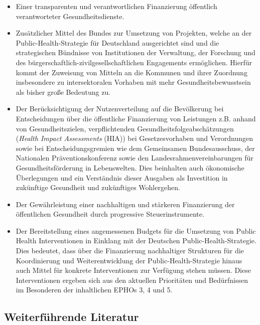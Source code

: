 \documentclass{article}
\begin{document}
\begin{itemize}
\item Einer transparenten und verantwortlichen Finanzierung öffentlich verantworteter Gesundheitsdienste. 


\item Zusätzlicher Mittel des Bundes zur Umsetzung von Projekten, welche an der Public-Health-Strategie für Deutschland ausgerichtet sind und die strategischen Bündnisse von Institutionen der Verwaltung, der Forschung und des bürgerschaftlich-zivilgesellschaftlichen Engagements ermöglichen. Hierfür kommt der Zuweisung von Mitteln an die Kommunen und ihrer Zuord­nung insbesondere zu intersektoralen Vorhaben mit mehr Gesundheitsbewusstsein als bisher große Bedeutung zu.


\item Der Berücksichtigung der Nutzenverteilung auf die Bevölkerung bei Entscheidungen über die öffentliche Finanzierung von Leistungen z.B. anhand von Gesundheitszielen, verpflichtenden Gesundheitsfolgeabschätzungen (\emph{Health Impact Assessments} (HIA)) bei Gesetzesvorhaben und Verordnungen sowie bei Entscheidungsgremien wie dem Gemeinsamen Bundesausschuss, der Nationalen Präventionskonferenz sowie den Landesrahmenvereinbarungen für Gesundheitsförderung in Lebenswelten. Dies beinhalten auch ökonomische Überlegungen und ein Verständnis dieser Ausgaben als Investition in zukünftige Gesundheit und zukünftiges Wohlergehen.


\item Der Gewährleistung einer nachhaltigen und stärkeren Finanzierung der öffentlichen Gesundheit durch progressive Steuerinstrumente. 


\item Der Bereitstellung eines angemessenen Budgets für die Umsetzung von Public Health Interventionen in Einklang mit der Deutschen Public-Health-Strategie. Dies bedeutet, dass über die Finanzierung nachhaltiger Strukturen für die Koordinierung und Weiterentwicklung der Public-Health-Strategie hinaus auch Mittel für konkrete Interventionen zur Verfügung stehen müssen. Diese Interventionen ergeben sich aus den aktuellen Prioritäten und Bedürfnissen im Besonderen der inhaltlichen EPHOs 3, 4 und 5. 


\end{itemize}

\subsection{Weiterführende Literatur}\label{H5454813}
\end{document}
